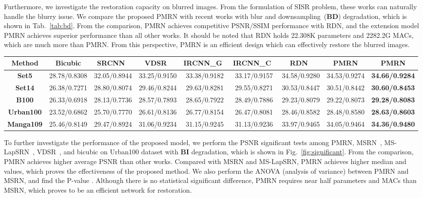 \documentclass[journal]{IEEEtran}
\begin{document}
Furthermore, we investigate the restoration capacity on blurred images. From the formulation of SISR problem, these works can naturally handle the blurry issue. We compare the proposed PMRN with recent works with blur and  downsampling~(\textbf{BD}) degradation, which is shown in Tab.~\ref{tab:bd}. From the comparison, PMRN achieves competitive PSNR/SSIM performance with RDN, and the extension model PMRN achieves superior performance than all other works. It should be noted that RDN holds 22.308K parameters and 2282.2G MACs, which are much more than PMRN. From this perspective, PMRN is an efficient design which can effectively restore the blurred images.

\begin{table*}
	\centering
	\caption{PSNR/SSIM comparisons on \textbf{BD} degradation.}
	\label{tab:bd}
	\begin{tabular}{|c|c|c|c|c|c|c|c|c|}
		\hline
		\textbf{Method}& Bicubic& SRCNN~\cite{srcnn}& VDSR~\cite{vdsr}& IRCNN\_G~\cite{ircnn_zhang2017learning}& IRCNN\_C~\cite{ircnn_zhang2017learning}& RDN~\cite{rdn2020}& PMRN& PMRN\\
		\hline
		\hline
		\textbf{Set5}& 			28.78/0.8308& 32.05/0.8944& 33.25/0.9150& 33.38/0.9182& 33.17/0.9157& 34.58/0.9280& 34.53/0.9274& \textbf{34.66/0.9284}\\
		\textbf{Set14}& 		26.38/0.7271& 28.80/0.8074& 29.46/0.8244& 29.63/0.8281& 29.55/0.8271& 30.53/0.8447& 30.51/0.8442& \textbf{30.60/0.8453}\\
		\textbf{B100}& 			26.33/0.6918& 28.13/0.7736& 28.57/0.7893& 28.65/0.7922& 28.49/0.7886& 29.23/0.8079& 29.22/0.8073& \textbf{29.28/0.8083}\\
		\textbf{Urban100}& 		23.52/0.6862& 25.70/0.7770& 26.61/0.8136& 26.77/0.8154& 26.47/0.8081& 28.46/0.8582& 28.48/0.8580& \textbf{28.63/0.8603}\\
		\textbf{Manga109}& 		25.46/0.8149& 29.47/0.8924& 31.06/0.9234& 31.15/0.9245& 31.13/0.9236& 33.97/0.9465& 34.05/0.9464& \textbf{34.36/0.9480}\\
		\hline
	\end{tabular}
\end{table*}
	

To further investigate the performance of the proposed model, we perform the PSNR significant tests among PMRN, MSRN~\cite{msrn}, MS-LapSRN~\cite{ms-lapsrn}, VDSR~\cite{vdsr}, and bicubic on Urban100 dataset with \textbf{BI} degradation, which is shown in Fig.~\ref{fig:significant}. From the comparison, PMRN achieves higher average PSNR than other works. Compared with MSRN and MS-LapSRN, PMRN achieves higher median  and  values, which proves the effectiveness of the proposed method. We also perform the ANOVA (analysis of variance) between PMRN and MSRN, and find the P-value . Although there is no statistical significant difference, PMRN requires near half parameters and MACs than MSRN, which proves to be an efficient network for restoration.
\end{document}
